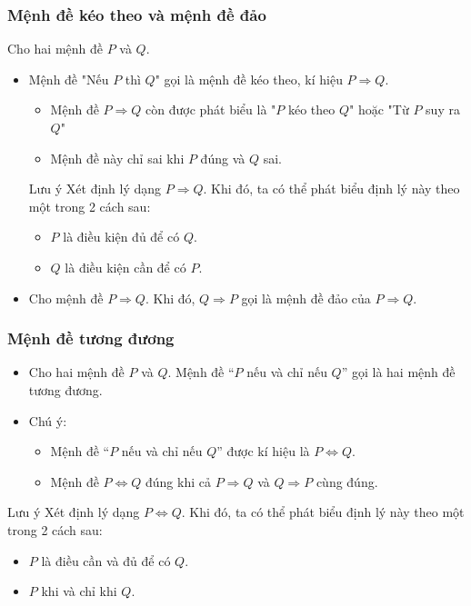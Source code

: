 \subsubsection{Mệnh đề kéo theo và mệnh đề đảo}
	Cho hai mệnh đề $P$ và $Q$.
		\begin{itemize}
			\item[\iconMT]  Mệnh đề "Nếu $P$ thì $Q$" gọi là mệnh đề kéo theo, kí hiệu  $P\Rightarrow Q$.
				\begin{boxkn}
			\begin{itemize}
				\item  Mệnh đề $P\Rightarrow Q$ còn được phát biểu là "$P$ kéo theo $Q$" hoặc "Từ $P$ suy ra $Q$"
				\item  Mệnh đề này chỉ sai khi $P$ đúng và $Q$ sai.
			\end{itemize}
				\end{boxkn}
				\begin{khung4}{Lưu ý}
					Xét định lý dạng $P\Rightarrow Q$. Khi đó, ta có thể phát biểu định lý này theo một trong 2 cách sau:
					\begin{itemize}
						\item[\ding{172}] $P$ là điều kiện đủ để có $Q$.
						\item[\ding{173}] $Q$ là điều kiện cần để có $P$.
					\end{itemize}
				\end{khung4}
			\item[\iconMT]  Cho mệnh đề $P\Rightarrow Q$. Khi đó, $Q\Rightarrow P$ gọi là mệnh đề đảo của $P\Rightarrow Q$.
			\end{itemize}
\subsubsection{Mệnh đề tương đương}
\begin{itemize}
	\item [\iconMT] Cho hai mệnh đề $P$ và $Q$. Mệnh đề ``$P$ nếu và chỉ nếu $Q$''  gọi là hai mệnh đề tương đương.
	\item [\iconMT] Chú ý:
	\begin{boxkn}
	\begin{itemize}
		\item  Mệnh đề ``$P$ nếu và chỉ nếu $Q$'' được kí hiệu là $P\Leftrightarrow Q$.
		\item 	Mệnh đề $P\Leftrightarrow Q$ đúng khi cả $P\Rightarrow Q$ và $Q\Rightarrow P$ cùng đúng.
	\end{itemize}
	\end{boxkn}
\end{itemize}
			\begin{khung4}{Lưu ý}
				Xét định lý dạng $P \Leftrightarrow Q$. Khi đó, ta có thể phát biểu định lý này theo một trong 2 cách sau:
				\begin{itemize}
					\item[\ding{172}] $P$ là điều cần và đủ để có $Q$.
					\item[\ding{173}] $P$ khi và chỉ khi $Q$.
				\end{itemize}
			\end{khung4}
